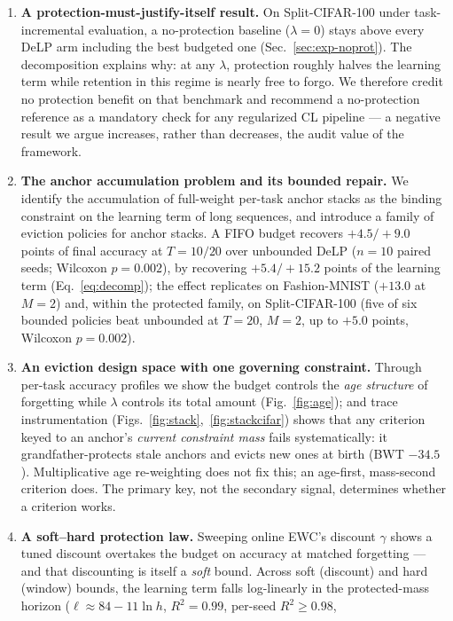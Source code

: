 \documentclass[review,12pt,number]{elsarticle}
\newcommand{\delp}{DeLP}
\begin{document}
\begin{enumerate}
\item \textbf{A protection-must-justify-itself result.} On
Split-CIFAR-100 under task-incremental evaluation, a no-protection
baseline ($\lambda{=}0$) stays above every \delp{} arm including the
best budgeted one (Sec.~\ref{sec:exp-noprot}). The decomposition
explains why: at any $\lambda$, protection roughly halves the learning
term while retention in this regime is nearly free to forgo. We therefore
credit no protection benefit on that benchmark and recommend a
no-protection reference as a mandatory check for any regularized CL
pipeline --- a negative result we argue increases, rather than
decreases, the audit value of the framework.
\item \textbf{The anchor accumulation problem and its bounded repair.}
We identify the accumulation of full-weight per-task anchor stacks as
the binding constraint on the learning term of long sequences, and
introduce a family of eviction policies for anchor stacks. A FIFO
budget recovers $+4.5/+9.0$ points of final accuracy at $T{=}10/20$
over unbounded \delp{} ($n{=}10$ paired seeds; Wilcoxon $p{=}0.002$),
by recovering $+5.4/+15.2$ points of the learning term
(Eq.~\ref{eq:decomp}); the effect replicates on Fashion-MNIST
($+13.0$ at $M{=}2$) and, within the protected family, on
Split-CIFAR-100 (five of six bounded policies beat unbounded at
$T{=}20$, $M{=}2$, up to $+5.0$ points, Wilcoxon $p{=}0.002$).
\item \textbf{An eviction design space with one governing constraint.}
Through per-task accuracy profiles we show the budget controls the
\emph{age structure} of forgetting while $\lambda$ controls its total
amount (Fig.~\ref{fig:age}); and trace instrumentation
(Figs.~\ref{fig:stack},~\ref{fig:stackcifar}) shows that any criterion
keyed to an anchor's \emph{current constraint mass} fails
systematically: it grandfather-protects stale anchors and evicts new
ones at birth (BWT $-34.5$). Multiplicative age re-weighting does not
fix this; an age-first, mass-second criterion does. The primary key,
not the secondary signal, determines whether a criterion works.
\item \textbf{A soft--hard protection law.} Sweeping online EWC's
discount $\gamma$ shows a tuned discount overtakes the budget on
accuracy at matched forgetting --- and that discounting is itself a
\emph{soft} bound. Across soft (discount) and hard (window) bounds, the
learning term falls log-linearly in the protected-mass horizon
($\ell \approx 84 - 11\ln h$, $R^2{=}0.99$, per-seed $R^2 \geq 0.98$,

\end{enumerate}
\end{document}
